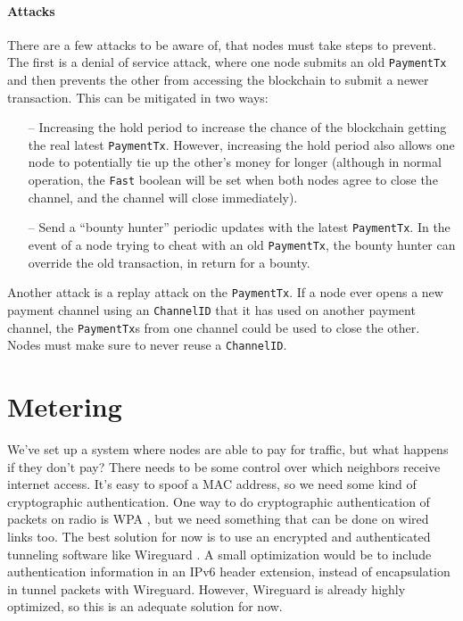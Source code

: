 \documentclass[11pt]{article}
\newlength{\currentparskip}
\newenvironment{unbreakable}
  {\setlength{\currentparskip}{\parskip}%
	 \vspace{\currentparskip}
   \begin{minipage}{\textwidth}%
   \setlength{\parskip}{\currentparskip}%
  }
  {\end{minipage}\vspace{\currentparskip}}
\begin{document}
\begin{unbreakable}
\paragraph{Attacks}
There are a few attacks to be aware of, that nodes must take steps to prevent. The first is a denial of service attack, where one node submits an old \texttt{PaymentTx} and then prevents the other from accessing the blockchain to submit a newer transaction. This can be mitigated in two ways:

\begin{itemize}
\item[--] Increasing the hold period to increase the chance of the blockchain getting the real latest \texttt{PaymentTx}. However, increasing the hold period also allows one node to potentially tie up the other’s money for longer (although in normal operation, the \texttt{Fast} boolean will be set when both nodes agree to close the channel, and the channel will close immediately).
 
\item[--] Send a ``bounty hunter'' periodic updates with the latest \texttt{PaymentTx}. In the event of a node trying to cheat with an old \texttt{PaymentTx}, the bounty hunter can override the old transaction, in return for a bounty.
\end{itemize}
\end{unbreakable}

Another attack is a replay attack on the \texttt{PaymentTx}. If a node ever opens a new payment channel using an \texttt{ChannelID} that it has used on another payment channel, the \texttt{PaymentTx}s from one channel could be used to close the other. Nodes must make sure to never reuse a \texttt{ChannelID}. 

\section{Metering}
\label{sec:metering}
We’ve set up a system where nodes are able to pay for traffic, but what happens if they don’t pay? There needs to be some control over which neighbors receive internet access. It’s easy to spoof a MAC address, so we need some kind of cryptographic authentication. One way to do cryptographic authentication of packets on radio is WPA \cite{80211i}, but we need something that can be done on wired links too. The best solution for now is to use an encrypted and authenticated tunneling software like Wireguard \cite{wireguard}. A small optimization would be to include authentication information in an IPv6 header extension, instead of encapsulation in tunnel packets with Wireguard. However, Wireguard is already highly optimized, so this is an adequate solution for now.
\end{document}
